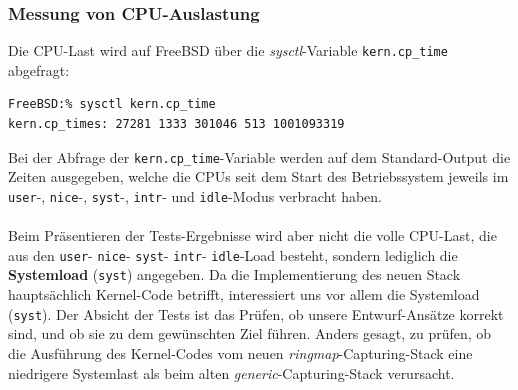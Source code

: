 \subsubsection*{Messung von CPU-Auslastung}
Die CPU-Last wird auf FreeBSD über die \emph{sysctl}-Variable
\lstset{language=bash} \verb+kern.cp_time+ abgefragt:
\begin{lstlisting}[captionpos={b}]
FreeBSD:% sysctl kern.cp_time
kern.cp_times: 27281 1333 301046 513 1001093319
\end{lstlisting}
Bei der Abfrage der \verb+kern.cp_time+-Variable werden auf dem Standard-Output die Zeiten
ausgegeben, welche die CPUs seit dem Start des Betriebssystem jeweils im \verb+user+-,  
\verb+nice+-, \verb+syst+-, \verb+intr+- und \verb+idle+-Modus verbracht
haben.\\\\
Beim Präsentieren der Tests-Ergebnisse wird aber nicht die volle CPU-Last, die
aus den \verb+user+- \verb+nice+- \verb+syst+- \verb+intr+- \verb+idle+-Load
besteht, sondern lediglich die \textbf{Systemload} (\verb+syst+) angegeben.  Da
die Implementierung des neuen Stack hauptsächlich Kernel-Code betrifft,
interessiert uns vor allem die Systemload (\verb+syst+).  Der Absicht der Tests
ist das Prüfen, ob unsere Entwurf-Ansätze korrekt sind, und ob sie zu dem
gewünschten Ziel führen. Anders gesagt, zu prüfen, ob die Ausführung des
Kernel-Codes vom neuen \emph{ringmap}-Capturing-Stack eine niedrigere
Systemlast als beim alten \emph{generic}-Capturing-Stack verursacht.
%
